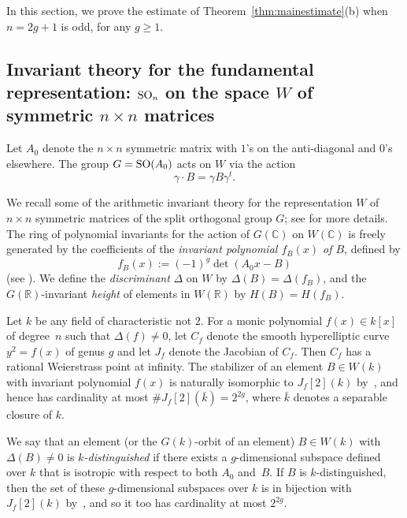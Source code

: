 \documentclass[11pt]{article}
\def\SO{{\rm SO}}
\def\R{{\mathbb R}}
\def\C{{\mathcal C}}
\def\C{{\mathbb C}}
\begin{document}
In this section, we prove the estimate of
Theorem~\ref{thm:mainestimate}(b) when $n=2g+1$ is odd, for any $g\geq
1$.

\subsection{Invariant theory for the fundamental representation:
  $\SO_n$ on the space $W$ of symmetric $n\times n$ matrices}

Let $A_0$ denote the $n\times n$ symmetric matrix with $1$'s on the
anti-diagonal and $0$'s elsewhere. The group $G=\SO(A_0)$ acts on $W$
via the action
\begin{equation*}
\gamma\cdot B=\gamma B\gamma^t.
\end{equation*}

We recall some of the arithmetic invariant theory for the
representation $W$ of $n\times n$ symmetric matrices of the split
orthogonal group $G$; see \cite{BG2} for more details.  The ring of
polynomial invariants for the action of $G(\C)$ on $W(\C)$ is freely
generated by the coefficients of the {\it invariant polynomial
  $f_B(x)$ of $B$}, defined by $$f_B(x):=(-1)^{g}\det(A_0x-B)$$ (see
\cite[\S4]{AITBG}). We define the {\it discriminant} $\Delta$ on $W$
by $\Delta(B)=\Delta(f_B)$, and the $G(\R)$-invariant {\it height} of
elements in $W(\R)$ by $H(B)=H(f_B).$


Let $k$ be any field of characteristic not $2$.
For a monic polynomial $f(x)\in k[x]$ of degree~$n$ such that
$\Delta(f)\neq0$, let $C_f$ denote the smooth hyperelliptic curve
$y^2=f(x)$ of genus $g$ and let $J_f$ denote the Jacobian of
$C_f$. Then $C_f$ has a rational Weierstrass point at infinity.
The stabilizer of an element $B\in W(k)$ with invariant polynomial
$f(x)$ is naturally isomorphic to $J_f[2](k)$
by~\cite[Proposition~5.1]{BG2}, and hence has cardinality at most
$\#J_f[2](\bar k)=2^{2g}$, where $\bar k$ denotes a separable closure
of $k$.

We say that an element (or the $G(k)$-orbit of an element) $B\in W(k)$ with $\Delta(B)\neq 0$
is {\it $k$-distinguished} if there exists a $g$-dimensional subspace
defined over $k$ that is isotropic with respect to both $A_0$ and~$B$. If $B$ is $k$-distinguished, then the set of these $g$-dimensional
subspaces over $k$ is in bijection with $J_f[2](k)$
by~\cite[Proposition~4.1]{BG2}, and so it too has cardinality at most
$2^{2g}$.
\end{document}
